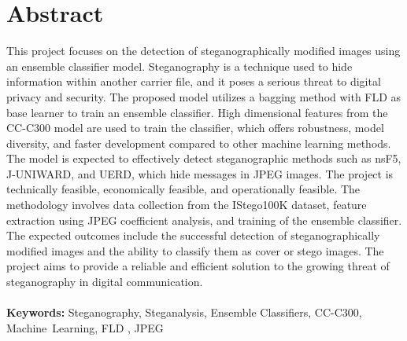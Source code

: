 \chapter*{Abstract}
\thispagestyle{plain}
\setcounter{page}{4}
\sloppy
This project focuses on the detection of steganographically modified images using an ensemble classifier model. Steganography is a technique used to hide information within another carrier file, and it poses a serious threat to digital privacy and security. The proposed model utilizes a bagging method with FLD as base learner to train an ensemble classifier. High dimensional features from the CC-C300 model are used to train the classifier, which offers robustness, model diversity, and faster development compared to other machine learning methods. The model is expected to effectively detect steganographic methods such as nsF5, J-UNIWARD, and UERD, which hide messages in JPEG images. The project is technically feasible, economically feasible, and operationally feasible. The methodology involves data collection from the IStego100K dataset, feature extraction using JPEG coefficient analysis, and training of the ensemble classifier. The expected outcomes include the successful detection of steganographically modified images and the ability to classify them as cover or stego images. The project aims to provide a reliable and efficient solution to the growing threat of steganography in digital communication. \\ \\
\normalsize{\textbf{Keywords:} Steganography, Steganalysis, Ensemble Classifiers, CC-C300, \mbox{Machine Learning}, FLD , JPEG }


